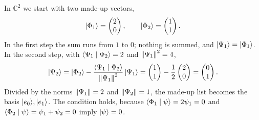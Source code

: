 \begin{example}
	In $\mathbb{C}^2$ we start with two made-up vectors,
	\begin{equation}
		\lvert \Phi_1 \rangle = \begin{pmatrix} 2 \\ 0 \end{pmatrix}, \qquad
		\lvert \Phi_2 \rangle = \begin{pmatrix} 1 \\ 1 \end{pmatrix}.
	\end{equation}
	In the first step the sum runs from $1$ to $0$; nothing is summed, and $\lvert \Psi_1 \rangle = \lvert \Phi_1 \rangle$. In the second step, with $\langle \Psi_1 \mid \Phi_2 \rangle = 2$ and $\left\lVert \Psi_1 \right\rVert^2 = 4$,
	\begin{equation}
		\lvert \Psi_2 \rangle = \lvert \Phi_2 \rangle - \frac{\langle \Psi_1 \mid \Phi_2 \rangle}{\left\lVert \Psi_1 \right\rVert^2}\,\lvert \Psi_1 \rangle
		= \begin{pmatrix} 1 \\ 1 \end{pmatrix} - \frac{1}{2}\begin{pmatrix} 2 \\ 0 \end{pmatrix}
		= \begin{pmatrix} 0 \\ 1 \end{pmatrix}.
	\end{equation}
	Divided by the norms $\left\lVert \Psi_1 \right\rVert = 2$ and $\left\lVert \Psi_2 \right\rVert = 1$, the made-up list becomes the basis $\lvert e_0 \rangle,\lvert e_1 \rangle$. The condition holds, because $\langle \Phi_1 \mid \psi \rangle = 2\psi_1 = 0$ and $\langle \Phi_2 \mid \psi \rangle = \psi_1 + \psi_2 = 0$ imply $\lvert \psi \rangle = 0$.
\end{example}
